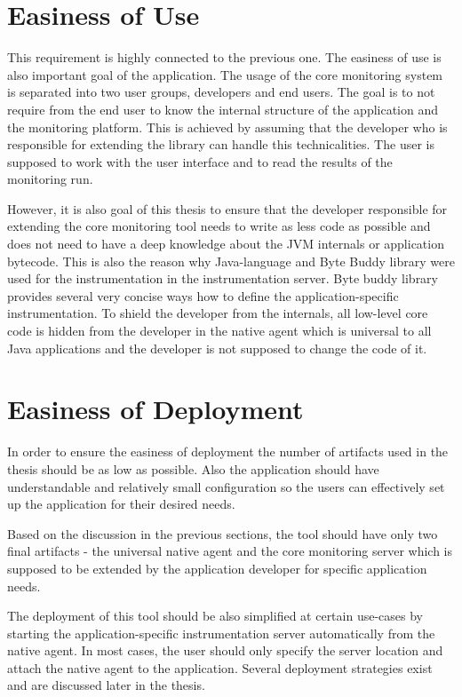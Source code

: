 \section{Easiness of Use}
This requirement is highly connected to the previous one. The easiness of use is also important goal of the application. The usage of the core monitoring system is separated into two user groups, developers and end users. The goal is to not require from the end user to know the internal structure of the application and the monitoring platform. This is achieved by assuming that the developer who is responsible for extending the library can handle this technicalities. The user is supposed to work with the user interface and to read the results of the monitoring run. 

However, it is also goal of this thesis to ensure that the developer responsible for extending the core monitoring tool needs to write as less code as possible and does not need to have a deep knowledge about the JVM internals or application bytecode. This is also the reason why Java-language and Byte Buddy library were used for the instrumentation in the instrumentation server. Byte buddy library provides several very concise ways how to define the application-specific instrumentation. To shield the developer from the internals, all low-level core code is hidden from the developer in the native agent which is universal to all Java applications and the developer is not supposed to change the code of it.

\section{Easiness of Deployment}
In order to ensure the easiness of deployment the number of artifacts used in the thesis should be as low as possible. Also the application should have understandable and relatively small configuration so the users can effectively set up the application for their desired needs. 

Based on the discussion in the previous sections, the tool should have only two final artifacts - the universal native agent and the core monitoring server which is supposed to be extended by the application developer for specific application needs.

The deployment of this tool should be also simplified at certain use-cases by starting the application-specific instrumentation server automatically from the native agent. In most cases, the user should only specify the server location and attach the native agent to the application. Several deployment strategies exist and are discussed later in the thesis.

